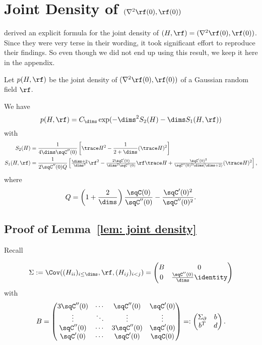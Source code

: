 \section{Joint Density of \texorpdfstring{\((\nabla^2\rf(0), \rf(0))\)}{(hessian ϕ(0), ϕ(0))}}

\textcite{brayStatisticsCriticalPoints2007} derived an explicit formula for the
joint density of \((H,\rf)=(\nabla^2\rf(0), \rf(0))\). Since they were very
terse in their wording, it took significant effort to reproduce their findings.
So even though we did not end up using this result, we keep it here in the
appendix.

Let \(p(H, \rf)\) be the joint density of \((\nabla^2\rf(0), \rf(0))\) of
a Gaussian random field \(\rf\).

\begin{lemma}\label{lem: joint density}
	We have
	\[
		p(H, \rf) = C_\dims \exp(-\dims^2 S_2(H) - \dims S_1(H, \rf))
	\]
	with
	\begin{align*}
		S_2(H)
		&= \frac{1}{4\dims\sqC''(0)}\left[
			\trace H^2 - \frac1{2+\dims}(\trace H)^2
		\right]
		\\
		S_1(H,\rf)
		&= \frac1{2\sqC''(0)Q}\left[
			\tfrac{\dims+2}{\dims^3}\rf^2
			- \tfrac{2\sqC'(0)}{\dims^2\sqC''(0)}\rf\trace H
			+ \tfrac{\sqC'(0)^2}{\sqC''(0)^2\dims(\dims+2)}(\trace H)^2
		\right],
	\end{align*}
	where
	\[
		Q = \left(1+\frac2\dims\right)
		\frac{\sqC(0)}{\sqC''(0)} - \frac{\sqC'(0)^2}{\sqC''(0)^2}.
	\]
\end{lemma}

\subsection{Proof of Lemma~\ref{lem: joint density}}\label{subsec: joint density derivation}

Recall

\[
	\Sigma := \Cov((H_{ii})_{i\le\dims}, \rf, (H_{ij})_{i<j})
	= \begin{pmatrix}
		B & 0\\
		0 & \frac{\sqC''(0)}{\dims}\identity
	\end{pmatrix}
\]
with
\[
	B = \begin{pmatrix}
		3\sqC''(0) &  \cdots & \sqC''(0)
		& \sqC'(0) \\
		\vdots & \ddots &\vdots & \vdots \\
		\sqC''(0) & \cdots &  3 \sqC''(0) & \sqC'(0)\\
		\sqC'(0)	& \cdots & \sqC'(0) & \sqC(0)
	\end{pmatrix}
	=: \begin{pmatrix}
		\Sigma_\partial & b \\
		b^T & d
	\end{pmatrix}.
\]

